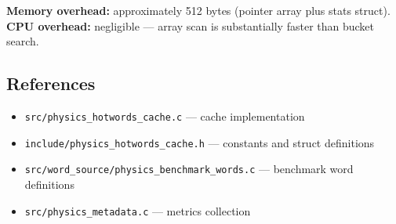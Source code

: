 \textbf{Memory overhead:} approximately 512 bytes (pointer array plus stats
struct). \textbf{CPU overhead:} negligible — array scan is substantially
faster than bucket search.

\subsection{References}

\begin{itemize}
  \item \texttt{src/physics\_hotwords\_cache.c} —
        cache implementation
  \item \texttt{include/physics\_hotwords\_cache.h} —
        constants and struct definitions
  \item \texttt{src/word\_source/physics\_benchmark\_words.c} —
        benchmark word definitions
  \item \texttt{src/physics\_metadata.c} —
        metrics collection
\end{itemize}
